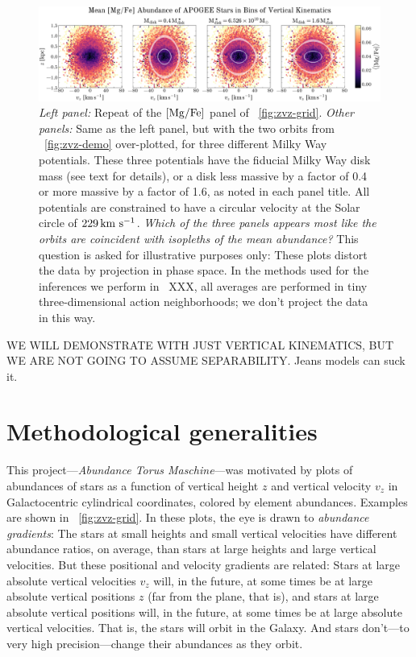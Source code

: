 \documentclass[modern]{aastex63}
\newcommand{\methodname}{\textsl{Abundance Torus Maschine}}
\newcommand{\methodname}{\textsl{Torus--Tangents Topography}}
\begin{document}
\begin{figure}[!tp]
  \begin{center}
  \includegraphics[width=\textwidth]{zvz-mean-MG_FE}
  \end{center}
  \caption{%
    \textsl{Left panel:} Repeat of the ${[\mathrm{Mg}/\mathrm{Fe}]}$ panel of \figurename~\ref{fig:zvz-grid}.
    \textsl{Other panels:} Same as the left panel, but with the two orbits
    from \figurename~\ref{fig:zvz-demo}
    over-plotted, for three different Milky Way potentials.
    These three potentials have the fiducial Milky Way disk mass (see text
    for details), or a disk less massive by a factor of 0.4 or more
    massive by a factor of 1.6, as noted in each panel title.
    All potentials are constrained to have a circular velocity at the
    Solar circle of $229\,\mathrm{km}~\mathrm{s}^{-1}$.
    \emph{Which of the three panels appears most like the orbits are
    coincident with isopleths of the mean abundance?}
    This question is asked for illustrative purposes only: These
    plots distort the data by projection in phase space.
    In the methods used for the inferences we perform in
    \sectionname~XXX, all averages are performed in tiny
    three-dimensional action neighborhoods; we don't project the data in this way.
  \label{fig:zvz-mgfe}
  }
\end{figure}

WE WILL DEMONSTRATE WITH JUST VERTICAL KINEMATICS, BUT WE ARE NOT
GOING TO ASSUME SEPARABILITY.  Jeans models can suck it.

\section{Methodological generalities}

This project---\methodname---was motivated by plots of abundances of stars as a
function of vertical height $z$ and vertical velocity $v_z$ in
Galactocentric cylindrical coordinates, colored by element abundances.
Examples are shown in \figurename~\ref{fig:zvz-grid}.
In these plots,
the eye is drawn to \emph{abundance gradients}: The stars at small
heights and small vertical velocities have different abundance ratios,
on average, than stars at large heights and large vertical velocities.
But these positional and velocity gradients are related:
Stars at large absolute vertical velocities $v_z$ will, in the future, at some
times be at large absolute vertical positions $z$ (far from the plane, that is),
and stars at large absolute vertical positions will, in the future,
at some times be at large absolute vertical velocities.
That is, the stars will orbit in the Galaxy.
And stars don't---to very high precision---change their abundances as
they orbit.
\end{document}
